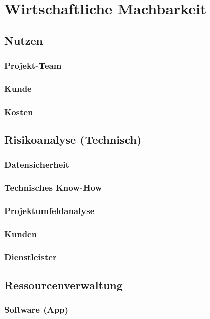 \chapter{Wirtschaftliche Machbarkeit}



\section{Nutzen}
	
	\subsection{Projekt-Team}

	\subsection{Kunde}

	\subsection{Kosten}

\section{Risikoanalyse (Technisch)}
	
	\subsection{Datensicherheit}

	\subsection{Technisches Know-How}

	\subsection{Projektumfeldanalyse}

	\subsection{Kunden}

	\subsection{Dienstleister}

\section{Ressourcenverwaltung}
	
	\subsection{Software (App)}
